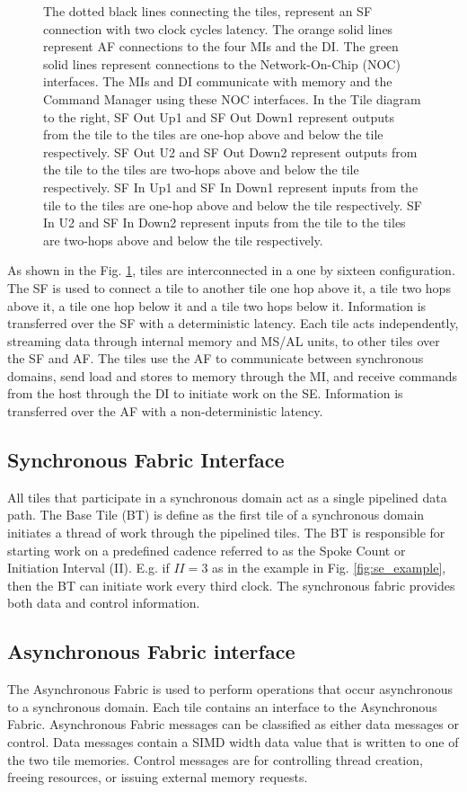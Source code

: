 \begin{figure}
{    The dotted black lines connecting the tiles, represent an SF connection with two clock cycles latency.
    The orange solid lines represent AF connections to the four MIs and the DI.
    The green solid lines represent connections to the Network-On-Chip (NOC) interfaces.
    The MIs and DI communicate with memory and the Command Manager using these NOC interfaces.
    In the Tile diagram to the right, SF Out Up1 and SF Out Down1 represent outputs from the tile to the tiles are one-hop above and below the tile respectively.
    SF Out U2 and SF Out Down2 represent outputs from the tile to the tiles are two-hops above and below the tile respectively.
    SF In Up1 and SF In Down1 represent inputs from the tile to the tiles are one-hop above and below the tile respectively.
    SF In U2 and SF In Down2 represent inputs from the tile to the tiles are two-hops above and below the tile respectively.
  }
  \label{fig:se_diagram}
\end{figure}

As shown in the Fig. \ref{fig:se_diagram}, tiles are interconnected in a one by sixteen configuration.
The SF is used to connect a tile to another tile one hop above it, a tile two hops above it, a tile one hop below it and a tile two hops below it.
Information is transferred over the SF with a deterministic latency. 
Each tile acts independently, streaming data through internal memory and MS/AL units, to other tiles over the SF and AF.
The tiles use the AF to communicate between synchronous domains, send load and stores to memory through the MI, and receive commands from the host through the DI to initiate work on the SE.
Information is transferred over the AF with a non-deterministic latency.


\subsection{Synchronous Fabric Interface}
All tiles that participate in a synchronous domain act as a single pipelined data path.
The Base Tile (BT) is define as the first tile of a synchronous domain initiates a thread of work through the pipelined tiles.
The BT is responsible for starting work on a predefined cadence referred to as the Spoke Count or Initiation Interval (II).
E.g. if $II = 3$ as in the example in Fig. \ref{fig:se_example}, then the BT can initiate work every third clock.
The synchronous fabric provides both data and control information.

\subsection{Asynchronous Fabric interface}
The Asynchronous Fabric is used to perform operations that occur asynchronous to a synchronous domain.
Each tile contains an interface to the Asynchronous Fabric.
Asynchronous Fabric messages can be classified as either data messages or control.
Data messages contain a SIMD width data value that is written to one of the two tile memories.
Control messages are for controlling thread creation, freeing resources, or issuing external memory requests.

